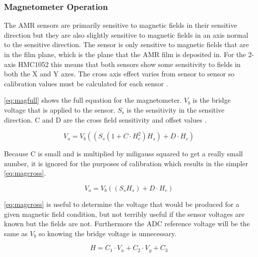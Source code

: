 \subsubsection{Magnetometer Operation}


The \ac{AMR} sensors are primarily sensitive to magnetic fields in their sensitive direction but they are also slightly sensitive to magnetic fields in an axis normal to the sensitive direction. The sensor is only sensitive to magnetic fields that are in the film plane, which is the plane that the \ac{AMR} film is deposited in. For the 2-axis HMC1052 this means that both sensors show some sensitivity to fields in both the X and Y axes. The cross axis effect varies from sensor to sensor  so calibration values must be calculated for each sensor \cite{AN215}.

\autoref{eq:magfull} shows the full equation for the magnetometer. $V_b$ is the bridge voltage that is applied to the sensor. $S_s$ is the sensitivity in the sensitive direction. C and D are the cross field sensitivity and offset values \cite{AN215}.

\begin{equation}
    V_o = V_b \left( \left( S_s \left( 1 + C \cdot H_c^2 \right) H_s \right) + D \cdot H_c \right)
    \label{eq:magfull}
\end{equation}

Because C is small and is multiplied by miligauss squared to get a really small number, it is ignored for the purposes of calibration which results in the simpler \autoref{eq:magcross}.

\begin{equation}
    V_o = V_b \left( \left( S_s H_s \right) + D \cdot H_c \right)
    \label{eq:magcross}
\end{equation}

\autoref{eq:magcross} is useful to determine the voltage that would be produced for a given magnetic field condition, but not terribly useful if the sensor voltages are known but the fields are not. Furthermore the \ac{ADC} reference voltage will be the same as $V_b$ so knowing the bridge voltage is unnecessary. 
 
\begin{equation}
    H = C_1 \cdot V_x + C_2 \cdot V_y + C_3
    \label{eq:magcal}
\end{equation}

